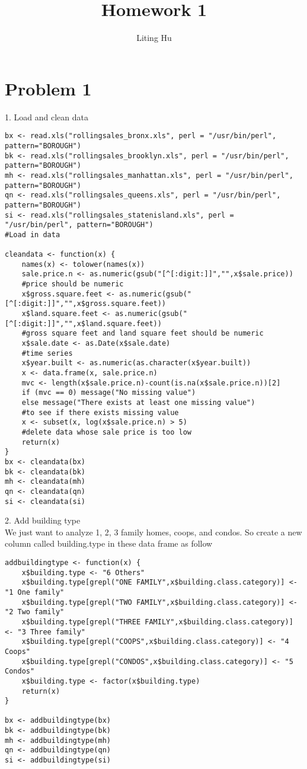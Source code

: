 \documentclass{article}
\begin{document}
  
\title{Homework 1}
\author{Liting Hu}

\maketitle

\section*{Problem 1}
1. Load and clean data
\begin{verbatim}
bx <- read.xls("rollingsales_bronx.xls", perl = "/usr/bin/perl", pattern="BOROUGH")
bk <- read.xls("rollingsales_brooklyn.xls", perl = "/usr/bin/perl", pattern="BOROUGH")
mh <- read.xls("rollingsales_manhattan.xls", perl = "/usr/bin/perl", pattern="BOROUGH")
qn <- read.xls("rollingsales_queens.xls", perl = "/usr/bin/perl", pattern="BOROUGH")
si <- read.xls("rollingsales_statenisland.xls", perl = "/usr/bin/perl", pattern="BOROUGH")
#Load in data

cleandata <- function(x) {
    names(x) <- tolower(names(x))
    sale.price.n <- as.numeric(gsub("[^[:digit:]]","",x$sale.price))
    #price should be numeric
    x$gross.square.feet <- as.numeric(gsub("[^[:digit:]]","",x$gross.square.feet))
    x$land.square.feet <- as.numeric(gsub("[^[:digit:]]","",x$land.square.feet))
    #gross square feet and land square feet should be numeric
    x$sale.date <- as.Date(x$sale.date)
    #time series
    x$year.built <- as.numeric(as.character(x$year.built))
    x <- data.frame(x, sale.price.n)
    mvc <- length(x$sale.price.n)-count(is.na(x$sale.price.n))[2]
    if (mvc == 0) message("No missing value")
    else message("There exists at least one missing value")
    #to see if there exists missing value
    x <- subset(x, log(x$sale.price.n) > 5)
    #delete data whose sale price is too low
    return(x)
}
bx <- cleandata(bx)
bk <- cleandata(bk)
mh <- cleandata(mh)
qn <- cleandata(qn)
si <- cleandata(si)
\end{verbatim}
2. Add building type\\
We just want to analyze 1, 2, 3 family homes, coops, and condos. So create a new column called building.type in these data frame as follow
\begin{verbatim}
addbuildingtype <- function(x) {
    x$building.type <- "6 Others"
    x$building.type[grepl("ONE FAMILY",x$building.class.category)] <- "1 One family"
    x$building.type[grepl("TWO FAMILY",x$building.class.category)] <- "2 Two family"
    x$building.type[grepl("THREE FAMILY",x$building.class.category)] <- "3 Three family"
    x$building.type[grepl("COOPS",x$building.class.category)] <- "4 Coops"
    x$building.type[grepl("CONDOS",x$building.class.category)] <- "5 Condos"
    x$building.type <- factor(x$building.type)
    return(x)
}

bx <- addbuildingtype(bx)
bk <- addbuildingtype(bk)
mh <- addbuildingtype(mh)
qn <- addbuildingtype(qn)
si <- addbuildingtype(si)
\end{verbatim}
\end{document}

